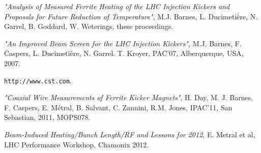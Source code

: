 \documentclass{JAC2003}
\begin{document}
\begin{thebibliography}{9}

\emph{"Analysis of Measured Ferrite Heating of the LHC Injection Kickers and Proposals for Future Reduction of Temperature"}, M.J. Barnes, L. Ducimetière, N. Garrel, B. Goddard, W. Weterings, these proceedings.

\emph{"An Improved Beam Screen for the LHC Injection Kickers"}, M.J. Barnes, F. Caspers, L. Ducimetière, N. Garrel. T. Kroyer, PAC'07, Alberquerque, USA, 2007.

\texttt{http://www.cst.com}.

\emph{"Coaxial Wire Measurements of Ferrite Kicker Magnets"}, H. Day, M. J. Barnes, F. Caspers, E. Métral, B. Salvant, C. Zannini, R.M. Jones, IPAC'11, San Sebastian, 2011, MOPS078.

\emph{Beam-Induced Heating/Bunch Length/RF and Lessons for 2012}, E. Metral et al, LHC Performance Workshop, Chamonix 2012. 


\end{thebibliography}
\end{document}
